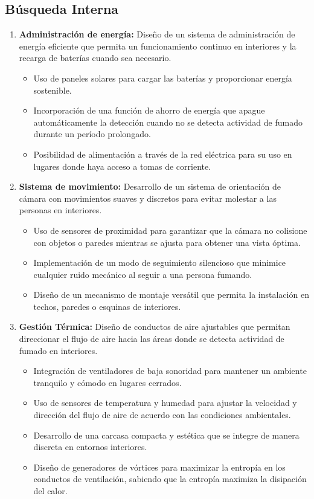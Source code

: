 \subsection{Búsqueda Interna}
\begin{enumerate}[label=\alph*)]

\item \textbf {Administración de energía:} Diseño de un sistema de administración de energía eficiente que permita un funcionamiento continuo en interiores y la recarga de baterías cuando sea necesario.
    \begin{itemize}
    \item Uso de paneles solares para cargar las baterías y proporcionar energía sostenible.
    \item Incorporación de una función de ahorro de energía que apague automáticamente la detección cuando no se detecta actividad de fumado durante un período prolongado.
    \item Posibilidad de alimentación a través de la red eléctrica para su uso en lugares donde haya acceso a tomas de corriente.
    \end{itemize}

\item \textbf{Sistema de movimiento:} Desarrollo de un sistema de orientación de cámara con movimientos suaves y discretos para evitar molestar a las personas en interiores.
    \begin{itemize}
    \item Uso de sensores de proximidad para garantizar que la cámara no colisione con objetos o paredes mientras se ajusta para obtener una vista óptima.
    \item Implementación de un modo de seguimiento silencioso que minimice cualquier ruido mecánico al seguir a una persona fumando.
    \item Diseño de un mecanismo de montaje versátil que permita la instalación en techos, paredes o esquinas de interiores.
    \end{itemize}

\item \textbf{Gestión Térmica:} Diseño de conductos de aire ajustables que permitan direccionar el flujo de aire hacia las áreas donde se detecta actividad de fumado en interiores.
    \begin{itemize}
    \item Integración de ventiladores de baja sonoridad para mantener un ambiente tranquilo y cómodo en lugares cerrados.
    \item Uso de sensores de temperatura y humedad para ajustar la velocidad y dirección del flujo de aire de acuerdo con las condiciones ambientales.
    \item Desarrollo de una carcasa compacta y estética que se integre de manera discreta en entornos interiores.
    \item Diseño de generadores de vórtices para maximizar la entropía en los conductos de ventilación, sabiendo que la entropía maximiza la disipación del calor.
    \end{itemize}
\end{enumerate}

